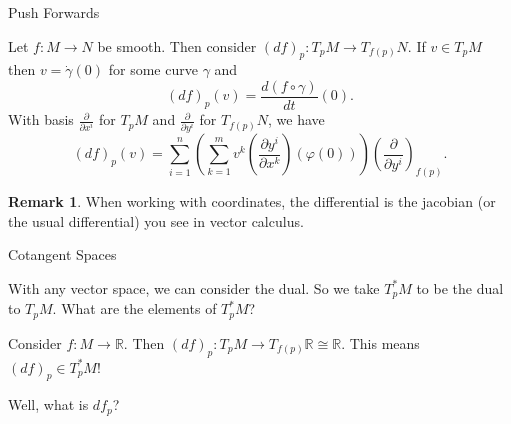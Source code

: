\documentclass[usenames,dvipsnames]{beamer}
\theoremstyle{definition}
\newtheorem*{remark}{Remark}
\theoremstyle{theorem}
\newcommand{\R}{\mathbb{R}}
\begin{document}
        \begin{frame}{Push Forwards}
            \begin{example}
                Let $f\colon M \to N$ be smooth.  Then consider $(df)_p\colon T_pM \to T_{f(p)}N$.  If $v\in T_pM$ then $v=\dot{\gamma}(0)$ for some curve $\gamma$ and
                \[
                (df)_p(v)=\frac{d(f\circ \gamma)}{dt}(0).
                \]
                With basis $\frac{\partial}{\partial x^i}$ for $T_pM$ and $\frac{\partial}{\partial y^i}$ for $T_{f(p)}N$, we have
                \[
                (df)_p(v)=\sum_{i=1}^n\left( \sum_{k=1}^m v^k \left( \frac{\partial y^i}{\partial x^k}\right)(\varphi(0))\right)\left(\frac{\partial}{\partial y^i}\right)_{f(p)}.
                \]
            \end{example}
            \begin{remark}
                When working with coordinates, the differential is the jacobian (or the usual differential) you see in vector calculus.
            \end{remark}
        \end{frame}


        \begin{frame}{Cotangent Spaces}
            \begin{paragraph}
                With any vector space, we can consider the dual.  So we take $T_p^*M$ to be the dual to $T_pM$. What are the elements of $T_p^*M$?
            \end{paragraph}
            
            \vspace*{.5cm}
            
            \begin{paragraph}
                Consider $f\colon M \to \R$.  Then $(df)_p \colon T_pM \to T_{f(p)}\R\cong \R$.  This means $(df)_p \in T_p^*M$! 
            \end{paragraph}
            \vspace*{.5cm}
            \begin{paragraph}
                Well, what is $df_p$?
            \end{paragraph}
        \end{frame}
\end{document}
